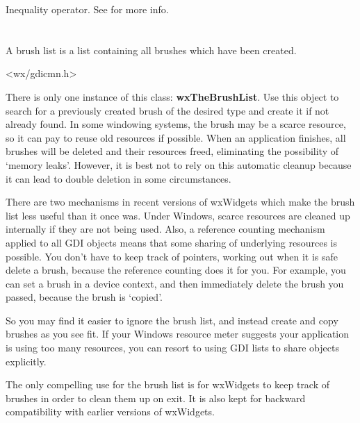 
Inequality operator.
See  for more info.


\section{}\label{wxbrushlist}

A brush list is a list containing all brushes which have been created.




<wx/gdicmn.h>




There is only one instance of this class: {\bf wxTheBrushList}.  Use
this object to search for a previously created brush of the desired
type and create it if not already found. In some windowing systems,
the brush may be a scarce resource, so it can pay to reuse old
resources if possible. When an application finishes, all brushes will
be deleted and their resources freed, eliminating the possibility of
`memory leaks'. However, it is best not to rely on this automatic
cleanup because it can lead to double deletion in some circumstances.

There are two mechanisms in recent versions of wxWidgets which make the
brush list less useful than it once was. Under Windows, scarce resources
are cleaned up internally if they are not being used. Also, a reference
counting mechanism applied to all GDI objects means that some sharing
of underlying resources is possible. You don't have to keep track of pointers,
working out when it is safe delete a brush, because the reference counting does
it for you. For example, you can set a brush in a device context, and then
immediately delete the brush you passed, because the brush is `copied'.

So you may find it easier to ignore the brush list, and instead create
and copy brushes as you see fit. If your Windows resource meter suggests
your application is using too many resources, you can resort to using
GDI lists to share objects explicitly.

The only compelling use for the brush list is for wxWidgets to keep
track of brushes in order to clean them up on exit. It is also kept for
backward compatibility with earlier versions of wxWidgets.

